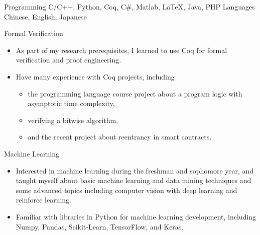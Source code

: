 

\begin{cvskills}

  \cvskill
    {Programming} %
    {C/C++, Python, Coq, C\#, Matlab, LaTeX, Java, PHP} %
\vspace{0.4em}
  \cvskill
    {Languages} %
    {Chinese, English, Japanese} %

\vspace{0.8em}
  \cvskill
    {Formal Verification}
    {
      \hspace{-2.5em}
      \begin{minipage}{0.94\linewidth}
        \begin{itemize}
          \item As part of my research prerequisites, I learned to use Coq for formal verification and proof engineering.
          \item Have many experience with Coq projects, including \begin{itemize}
            \item the programming language course project about a program logic with asymptotic time complexity,
            \item verifying a bitwise algorithm,
            \item and the recent project about reentrancy in smart contracts.
          \end{itemize}
        \end{itemize}
      \end{minipage}
    }

\vspace{0.8em}
  \cvskill
    {Machine Learning} %
    {
      \hspace{-2.5em}
      \begin{minipage}{0.94\linewidth}
        \begin{itemize}
          \item Interested in machine learning during the freshman and sophomore year, and taught myself about basic machine learning and data mining techniques and some advanced topics including computer vision with deep learning and reinforce learning.
          \item Familiar with libraries in Python for machine learning development, including Numpy, Pandas, Scikit-Learn, TensorFlow, and Keras.
        \end{itemize}
      \end{minipage}
    } %
  

\end{cvskills}
